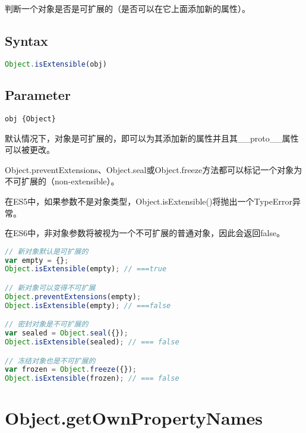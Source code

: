 判断一个对象是否是可扩展的（是否可以在它上面添加新的属性）。


\subsection{Syntax}


\begin{lstlisting}[language=JavaScript]
Object.isExtensible(obj)
\end{lstlisting}


\subsection{Parameter}


\begin{compactitem}
\item \texttt{obj \{Object\} }
\end{compactitem}

默认情况下，对象是可扩展的，即可以为其添加新的属性并且其\_\_proto\_\_属性可以被更改。

Object.preventExtensions、Object.seal或Object.freeze方法都可以标记一个对象为不可扩展的（non-extensible）。

\begin{compactitem}
\item 在ES5中，如果参数不是对象类型，Object.isExtensible()将抛出一个TypeError异常。
\item 在ES6中，非对象参数将被视为一个不可扩展的普通对象，因此会返回false。
\end{compactitem}



\begin{lstlisting}[language=JavaScript]
// 新对象默认是可扩展的
var empty = {};
Object.isExtensible(empty); // ===true

// 新对象可以变得不可扩展
Object.preventExtensions(empty);
Object.isExtensible(empty); // ===false

// 密封对象是不可扩展的
var sealed = Object.seal({});
Object.isExtensible(sealed); // === false

// 冻结对象也是不可扩展的
var frozen = Object.freeze({});
Object.isExtensible(frozen); // === false
\end{lstlisting}



\section{Object.getOwnPropertyNames}

